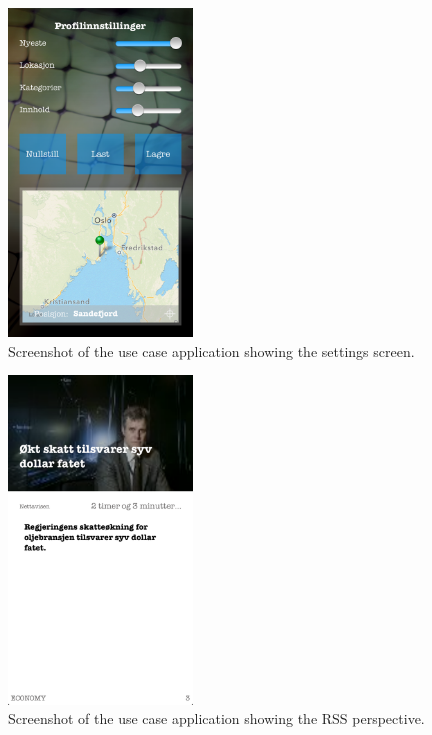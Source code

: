 \begin{figure}[!htbp]
\centering
\includegraphics[width=49mm]{GFX/usecase/settings.png}
\caption{Screenshot of the use case application showing the settings screen.}
\label{usecase_settings}
\end{figure}

\begin{figure}[!htbp]
\centering
\includegraphics[width=49mm]{GFX/usecase/rssEconomy.png}
\caption{Screenshot of the use case application showing the RSS perspective.}
\label{usecase_rss}
\end{figure}

